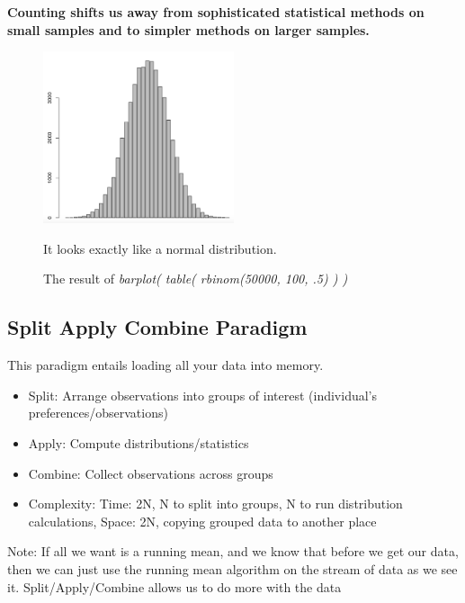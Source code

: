 \textbf{Counting shifts us away from sophisticated statistical methods on small samples and to simpler methods on larger samples.}


\begin{figure}[ht]
  \begin{center}
    \includegraphics[width=0.5\textwidth]{figures/NormalDist.png}
    \caption{
      The result of \textit{barplot( table( rbinom(50000, 100, .5) ) )}}It looks exactly like a normal distribution.
    \label{fig:example_figure}
  \end{center}
\end{figure}


\subsection{Split Apply Combine Paradigm}

This paradigm entails loading all your data into memory. 
\begin{itemize}
	\item Split: Arrange observations into groups of interest (individual’s preferences/observations)
    \item Apply: Compute distributions/statistics
    \item Combine: Collect observations across groups
    \item Complexity: Time: 2N, N to split into groups, N to run distribution calculations, Space: 2N, copying grouped data to another place 
\end{itemize}
Note: If all we want is a running mean, and we know that before we get our data, then we can just use the running mean algorithm on the stream of data as we see it. Split/Apply/Combine allows us to do more with the data

